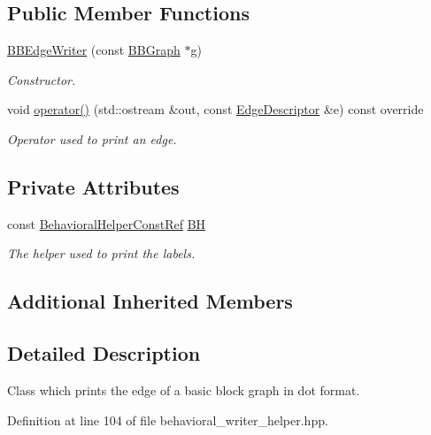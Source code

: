 \subsection*{Public Member Functions}
\begin{DoxyCompactItemize}
\item 
\hyperlink{classBBEdgeWriter_a52f9985a03b298a564c1284cb635934e}{B\+B\+Edge\+Writer} (const \hyperlink{structBBGraph}{B\+B\+Graph} $\ast$g)
\begin{DoxyCompactList}\small\item\em Constructor. \end{DoxyCompactList}\item 
void \hyperlink{classBBEdgeWriter_a9f9d0af976dfe274cc81eecd9c28d832}{operator()} (std\+::ostream \&out, const \hyperlink{graph_8hpp_a9eb9afea34e09f484b21f2efd263dd48}{Edge\+Descriptor} \&e) const override
\begin{DoxyCompactList}\small\item\em Operator used to print an edge. \end{DoxyCompactList}\end{DoxyCompactItemize}
\subsection*{Private Attributes}
\begin{DoxyCompactItemize}
\item 
const \hyperlink{behavioral__helper_8hpp_aae973b54cac87eef3b27442aa3e1e425}{Behavioral\+Helper\+Const\+Ref} \hyperlink{classBBEdgeWriter_afdef315282fd8c5241421ef50143536f}{BH}
\begin{DoxyCompactList}\small\item\em The helper used to print the labels. \end{DoxyCompactList}\end{DoxyCompactItemize}
\subsection*{Additional Inherited Members}


\subsection{Detailed Description}
Class which prints the edge of a basic block graph in dot format. 

Definition at line 104 of file behavioral\+\_\+writer\+\_\+helper.\+hpp.



